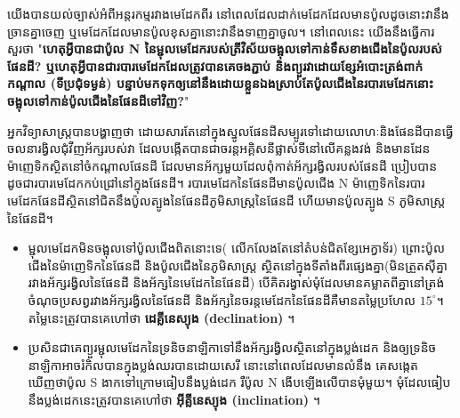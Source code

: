 យើងបានយល់ច្បាស់អំពីអន្តរកម្មរវាងមេដែកពីរ
នៅពេលដែលដាក់មេដែកដែលមានប៉ូលដូចនោះវានឹងច្រានគ្នាចេញ
ឬមេដែកដែលមានប៉ូលខុសគ្នានោះវានឹងទាញគ្នាចូល។
នៅពេលនេះ យើងនឹងធ្វើការសួរថា "\textbf{ហេតុអ្វីបានជាប៉ូល {\englishfont N} នៃម្ជុលមេដែករបស់ត្រីវិស័យចង្អុលទៅកាន់ទឹសខាងជើងនៃប៉ូលរបស់ផែនដី? ឬហេតុអ្វីបានជារបារមេដែកដែលត្រូវបានគេចងភ្ជាប់ និងព្យួរវាដោយខ្សែអំបោះត្រង់ពាក់កណ្តាល (ទីប្រជុំទម្ងន់) បន្ទាប់មកទុកឲ្យនៅនឹងដោយខ្លួនឯងស្រាប់តែប៉ូលជើងនៃរបារមេដែកនោះចង្អុលទៅកាន់ប៉ូលជើងនៃផែនដីទៅវិញ?}"\\
\noindent
\begin{minipage}[t]{0.45\textwidth}
	\raggedright
	អ្នកវិទ្យាសាស្ត្របានបង្ហាញថា
	ដោយសារតែនៅក្នុងស្នូលផែនដីសម្បូរទៅដោយលោហៈនិងផែនដីបានធ្វើចលនារង្វិលជុំវីញអ័ក្សរបស់វា
	ដែលបង្កើតបានជាចរន្តអគ្គិសនីផ្លាស់ទីនៅលើគន្លងវង់ និងមានដែនម៉ាញេទិកស្ថិតនៅចំកណ្តាលផែនដី ដែលមានអ័ក្សមួយដែលពុំកាត់អ័ក្សរង្វិលរបស់ផែនដី ប្រៀបបានដូចជារបារមេដែកកប់ជ្រៅនៅក្នុងផែនដី។
	របារមេដែកនៃផែនដីមានប៉ូលជើង {\englishfont N}
	ម៉ាញេទិកនៃរបារមេដែកផែនដីស្ថិតនៅជិតនឹងប៉ូលត្បូងនៃផែនដីភូមិសាស្ត្រនៃផែនដី ហើយមានប៉ូលត្បូង {\englishfont S}
	ភូមិសាស្ត្រនៃផែនដី។
\end{minipage}%
\hfill
\begin{minipage}[t]{0.55\textwidth}
	\vspace{0pt}
\end{minipage}
\noindent
\begin{minipage}[t]{0.55\textwidth}
	\raggedright
	\begin{itemize}[label={\textcolor{brownheader}{\faCaretRight}}]
    \item ម្ជុលមេដែកមិនចង្អុលទៅប៉ូលជើងពិតនោះទេ(
    លើកលែងតែនៅតំបន់ជិតខ្សែអេក្វាទ័រ)
    ព្រោះប៉ូលជើងនៃម៉ាញេទិកនៃផែនដី
    និងប៉ូលជើងនៃភូមិសាស្ត្រ ស្ថិតនៅក្នុងទីតាំងពីរផ្សេងគ្នា(មិនត្រួតស៊ីគ្នារវាងអ័ក្សរង្វិលនៃផែនដី និងអ័ក្សនៃមេដែកនៃផែនដី) បើគិតរង្វាស់មុំដែលមានគម្លាតពីគ្នានៅត្រង់ចំណុចប្រសព្វរវាងអ័ក្សរង្វិលនៃផែនដី និងអ័ក្សនៃចរន្តមេដែកនៃផែនដីគឺមានតម្លៃប្រហែល $15^\circ$។ តម្លៃនេះត្រូវបានគេហៅថា \textbf{ដេគ្លីនេស្យុង (declination)} ។
    \item ប្រសិនជាគេព្យួរម្ជុលមេដែកនៃទ្រនិចនាឡិកាទៅនឹងអ័ក្សរង្វិលស្ថិតនៅក្នុងប្លង់ដេក និងឲ្យទ្រនិចនាឡិកាអាចរំកិលបានក្នុងប្លង់ឈរបានដោយសេរី នោះនៅពេលដែលមានលំនឹង គេសង្កេតឃើញថាប៉ូល S ងាកទៅក្រោមធៀបនឹងប្លង់ដេក រឺប៉ូល N ងើបឡើងលើបានមុំមួយ។ មុំដែលធៀបនឹងប្លង់ដេកនេះត្រូវបានគេហៅថា \textbf{អ៊ីគ្លីនេស្យុង (inclination)} ។
	\end{itemize}
\end{minipage}%
\hfill
\begin{minipage}[t]{0.45\textwidth}
	\vspace{0pt}
\end{minipage}

